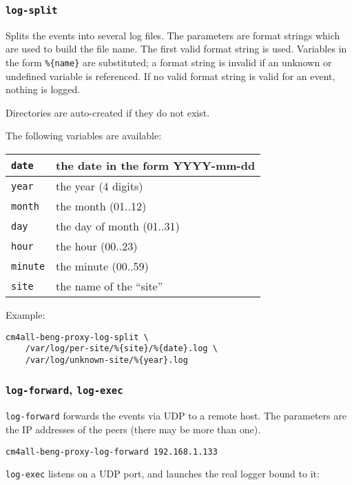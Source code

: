 \documentclass[a4paper,12pt]{article}
\begin{document}
\subsubsection{\texttt{log-split}}

Splits the events into several log files.  The parameters are format
strings which are used to build the file name.  The first valid format
string is used.  Variables in the form \texttt{\%\{name\}} are
substituted; a format string is invalid if an unknown or undefined
variable is referenced.  If no valid format string is valid for an
event, nothing is logged.

Directories are auto-created if they do not exist.

The following variables are available:

\begin{tabular}{|l|p{8cm}|}
\hline
\texttt{date} & the date in the form YYYY-mm-dd \\
\hline
\texttt{year} & the year (4 digits) \\
\hline
\texttt{month} & the month (01..12) \\
\hline
\texttt{day} & the day of month (01..31) \\
\hline
\texttt{hour} & the hour (00..23) \\
\hline
\texttt{minute} & the minute (00..59) \\
\hline
\texttt{site} & the name of the ``site'' \\
\hline
\end{tabular}

Example:

\begin{verbatim}
cm4all-beng-proxy-log-split \
    /var/log/per-site/%{site}/%{date}.log \
    /var/log/unknown-site/%{year}.log
\end{verbatim}

\subsubsection{\texttt{log-forward}, \texttt{log-exec}}

\texttt{log-forward} forwards the events via UDP to a remote host.
The parameters are the IP addresses of the peers (there may be more
than one).

\begin{verbatim}
cm4all-beng-proxy-log-forward 192.168.1.133
\end{verbatim}

\texttt{log-exec} listens on a UDP port, and launches the real logger
bound to it:
\end{document}

